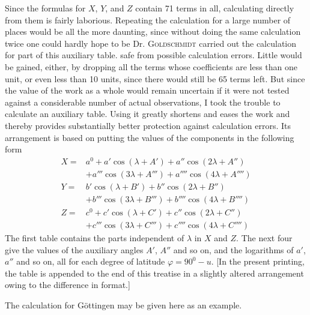 Since the formulas for $X$, $Y$, and $Z$ contain 71 terms in all, calculating directly from them is fairly laborious. Repeating the calculation for a large number of places would be all the more daunting, since without doing the same calculation twice one could hardly hope to be
\expandafter\def\csname HistoricalNoteText19\endcsname{Dr. \textsc{Goldschmidt} carried out the calculation for part of this auxiliary table.}
safe from possible calculation errors. Little would be gained, either, by dropping all the terms whose coefficients are less than one unit, or even less than 10 units, since there would still be 65 terms left. But since the value of the work as a whole would remain uncertain if it were not tested against a considerable number of actual observations, I took the trouble to calculate an auxiliary table. Using it greatly shortens and eases the work and thereby provides substantially better protection against calculation errors. Its arrangement is based on putting the values of the components in the following form
\[
\begin{aligned}
X={}&a^0+a'\cos(\lambda+A')+a''\cos(2\lambda+A'')\\
&+a'''\cos(3\lambda+A''')+a''''\cos(4\lambda+A'''')\\
Y={}&b'\cos(\lambda+B')+b''\cos(2\lambda+B'')\\
&+b'''\cos(3\lambda+B''')+b''''\cos(4\lambda+B'''')\\
Z={}&c^0+c'\cos(\lambda+C')+c''\cos(2\lambda+C'')\\
&+c'''\cos(3\lambda+C''')+c''''\cos(4\lambda+C'''')
\end{aligned}
\]
The first table contains the parts independent of $\lambda$ in $X$ and $Z$. The next four give the values of the auxiliary angles $A'$, $A''$ and so on, and the logarithms of $a'$, $a''$ and so on, all for each degree of latitude $\varphi=90^0-u$. [In the present printing, the table is appended to the end of this treatise in a slightly altered arrangement owing to the difference in format.]

The calculation for Göttingen may be given here as an example.

